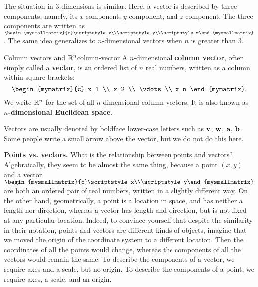 The situation in $3$ dimensions is similar. Here, a vector is
described by three components, namely, its $x$-component,
$y$-component, and $z$-component. The three components are written as
$\begin{mysmallmatrix}{c}\scriptstyle x\\\scriptstyle y\\\scriptstyle
  z\end{mysmallmatrix}$. The same idea generalizes to $n$-dimensional
vectors when $n$ is greater than $3$.

\begin{definition}{Column vectors and $\mathbb{R}^n$}{column-vector}
  A $n$-dimensional
  \textbf{column vector},
  often simply called a \textbf{vector}, is an ordered list
  of $n$ real numbers, written as a column within square brackets:
  \begin{equation*}
    \begin{mymatrix}{c}
      x_1 \\
      x_2 \\
      \vdots \\
      x_n
    \end{mymatrix}.
  \end{equation*}
  We write $\mathbb{R}^n$ for the set of all $n$-dimensional
  column vectors. It is also known as \textbf{$n$-dimensional
    Euclidean space}.
\end{definition}
Vectors are usually denoted by boldface lower-case letters such as
$\vect{v}$, $\vect{w}$, $\vect{a}$, $\vect{b}$. Some people write a
small arrow above the vector, but we do not do this here.
\bigskip

\noindent\textbf{Points vs. vectors.}
What is the relationship between points and vectors? Algebraically,
they seem to be almost the same thing, because a point $(x,y)$ and a
vector
$\begin{mysmallmatrix}{c}\scriptstyle x\\\scriptstyle
  y\end{mysmallmatrix}$ are both an ordered pair of real numbers,
written in a slightly different way. On the other hand, geometrically,
a point is a location in space, and has neither a length nor
direction, whereas a vector has length and direction, but is not fixed
at any particular location. Indeed, to convince yourself that despite
the similarity in their notation, points and vectors are different
kinds of objects, imagine that we moved the origin of the coordinate
system to a different location. Then the coordinates of all the points
would change, whereas the components of all the vectors would remain
the same. To describe the components of a vector, we require axes and
a scale, but no origin. To describe the components of a point, we
require axes, a scale, and an origin.  \bigskip

